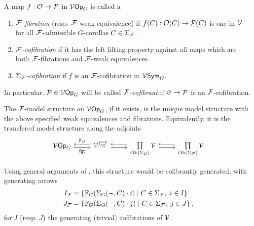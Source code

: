 \documentclass[a4paper,10pt]{article}%
\begin{document}
\begin{definition}
  A map $f: \O \to \P$ in $\V\Op_G$ is called a 
  \begin{enumerate}
  \item \textit{$\F$-fibration} (resp. $\F$-weak equivalence) if $f(C):\O(C) \to \P(C)$ is one in $\V$ for all $\F$-admissible $G$-corollas $C\in\Sigma_\F$.
  \item \textit{$\F$-cofibration} if it has the left lifting property against all maps which are both $\F$-fibrations and $\F$-weak equivalences.
  \item \textit{$\Sigma_\F$-cofibration} if $f$ is an $\F$-cofibration in $\V\Sym_G$.
  \end{enumerate}
\end{definition}
In particular, $\P\in \V\Op_G$ will be called \textit{$\F$-cofibrant} if $\varnothing \to \P$ is an $\F$-cofibration.
\begin{definition}
  The $\F$-model structure on $\V\Op_G$, if it exists, is the unique model structure with the above specified weak equivalences and fibrations. Equivalently, it is the transfered model structure along the adjoints
\[
\begin{tikzcd}
  \V\Op_G \arrow[r, shift right, "\mathsf{fgt}"'] & \V^{\Sigma_G^{op}} \arrow[l, shift right, "\mathbb F_G"'] \arrow[r, shift right] & \prod\limits_{\mathrm{Ob}(\Sigma_G)}\V \arrow[l, shift right] \arrow[r, shift right] & \prod\limits_{\mathrm{Ob}(\Sigma_\F)}\V \arrow[l, shift right]
\end{tikzcd}
\]
\end{definition}

Using general arguments of \cite{Hi03}, this structure would be cofibrantly generated, with generating arrows
\begin{align*}
  I_\F &= \sets{\mathbb F_G(\Sigma_G(-,C) \cdot i)}{C \in \Sigma_\F,\ i\in I}\\
  J_\F &= \sets{\mathbb F_G(\Sigma_G(-,C) \cdot j)}{C \in \Sigma_\F,\ j\in J},
\end{align*}
for $I$ (resp. $J$) the generating (trivial) cofibrations of $\V$.
\end{document}
